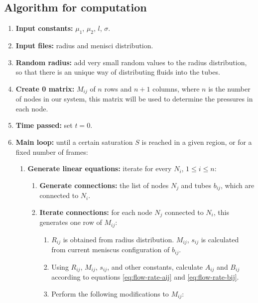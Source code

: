 \subsection{Algorithm for computation} \label{sec:detailed-algorithm}
	\begin{enumerate}
		\item \textbf{Input constants:} ${\mu}_{1}$, ${\mu}_{2}$, $l$, $\sigma$.
		
		\item \textbf{Input files:} radius and menisci distribution.
		
		\item \textbf{Random radius:} add very small random values to the radius distribution, so that there is an unique way of distributing fluids into the tubes.
		
		\item \textbf{Create 0 matrix:} $M_{ij}$ of $n$ rows and $n + 1$ columns, where $n$ is the number of nodes in our system, this matrix will be used to determine the pressures in each node.
		
		\item \textbf{Time passed:} set $t = 0$.
		\item \textbf{Main loop:} until a certain saturation $S$ is reached in a given region, or for a fixed number of frames:
		\begin{enumerate}
			\item \textbf{Generate linear equations:} iterate for every $N_i$, $1 \le i \le n$:
			
			\begin{enumerate}
				\item \textbf{Generate connections:} the list of nodes $N_j$ and tubes $b_{ij}$, which are connected to $N_i$.
				
				\item \textbf{Iterate connections:} for each node $N_j$ connected to $N_i$, this generates one row of $M_{ij}$:
				
				\begin{enumerate}
					\item $R_{ij}$ is obtained from radius distribution. $M_{ij}$, $s_{ij}$ is calculated from current meniscus configuration of $b_{ij}$.
					
					\item Using $R_{ij}$, $M_{ij}$, $s_{ij}$, and other constants, calculate $A_{ij}$ and $B_{ij}$ according to equations \ref{eq:flow-rate-aij} and \ref{eq:flow-rate-bij}.
					
					\item Perform the following modifications to $M_{ij}$:
					

\end{enumerate}
\end{enumerate}
\end{enumerate}
\end{enumerate}
